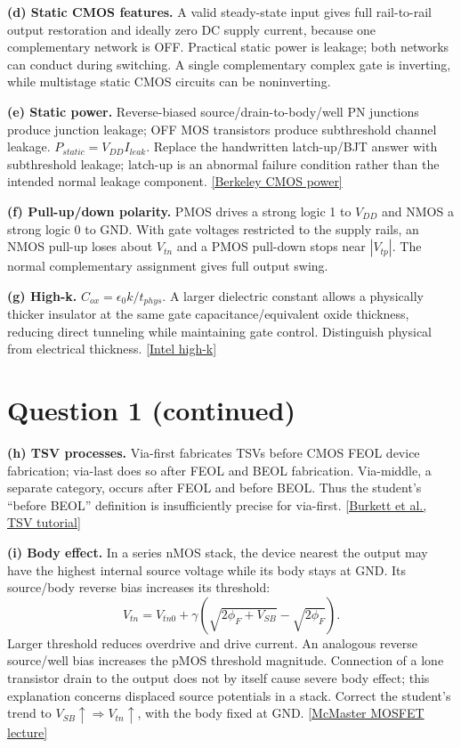 \documentclass[10pt]{article}
\begin{document}
\textbf{(d) Static CMOS features.} A valid steady-state input gives full rail-to-rail output restoration and ideally zero DC supply current, because one complementary network is OFF. Practical static power is leakage; both networks can conduct during switching. A single complementary complex gate is inverting, while multistage static CMOS circuits can be noninverting.

\textbf{(e) Static power.} Reverse-biased source/drain-to-body/well PN junctions produce junction leakage; OFF MOS transistors produce subthreshold channel leakage. $P_{static}=V_{DD}I_{leak}$. Replace the handwritten latch-up/BJT answer with subthreshold leakage; latch-up is an abnormal failure condition rather than the intended normal leakage component. \href{https://people.eecs.berkeley.edu/~alanmi/research/timing/papers/lec25_bw_2xp.pdf}{[Berkeley CMOS power]}

\textbf{(f) Pull-up/down polarity.} PMOS drives a strong logic 1 to $V_{DD}$ and NMOS a strong logic 0 to GND. With gate voltages restricted to the supply rails, an NMOS pull-up loses about $V_{tn}$ and a PMOS pull-down stops near $|V_{tp}|$. The normal complementary assignment gives full output swing.

\textbf{(g) High-k.} $C_{ox}=\epsilon_0 k/t_{phys}$. A larger dielectric constant allows a physically thicker insulator at the same gate capacitance/equivalent oxide thickness, reducing direct tunneling while maintaining gate control. Distinguish physical from electrical thickness. \href{https://www.intel.com/pressroom/kits/advancedtech/doodle/ref_HiK-MG/high-k.htm}{[Intel high-k]}

\newpage\section*{Question 1 (continued)}
\textbf{(h) TSV processes.} Via-first fabricates TSVs before CMOS FEOL device fabrication; via-last does so after FEOL and BEOL fabrication. Via-middle, a separate category, occurs after FEOL and before BEOL. Thus the student's ``before BEOL'' definition is insufficiently precise for via-first. \href{https://doi.org/10.1116/6.0000026}{[Burkett et al., TSV tutorial]}

\textbf{(i) Body effect.} In a series nMOS stack, the device nearest the output may have the highest internal source voltage while its body stays at GND. Its source/body reverse bias increases its threshold:
\[V_{tn}=V_{tn0}+\gamma\left(\sqrt{2\phi_F+V_{SB}}-\sqrt{2\phi_F}\right).\]
Larger threshold reduces overdrive and drive current. An analogous reverse source/well bias increases the pMOS threshold magnitude. Connection of a lone transistor drain to the output does not by itself cause severe body effect; this explanation concerns displaced source potentials in a stack. Correct the student's trend to $V_{SB}\uparrow\Rightarrow V_{tn}\uparrow$, with the body fixed at GND. \href{https://www.ece.mcmaster.ca/faculty/bakr/ece2ei4/Lecture16_Web.pdf}{[McMaster MOSFET lecture]}
\end{document}
